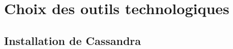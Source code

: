 \chapter{Choix des outils technologiques}
    
    \newpage
    \section{Installation de Cassandra}
    
    \newpage
    
    
    



